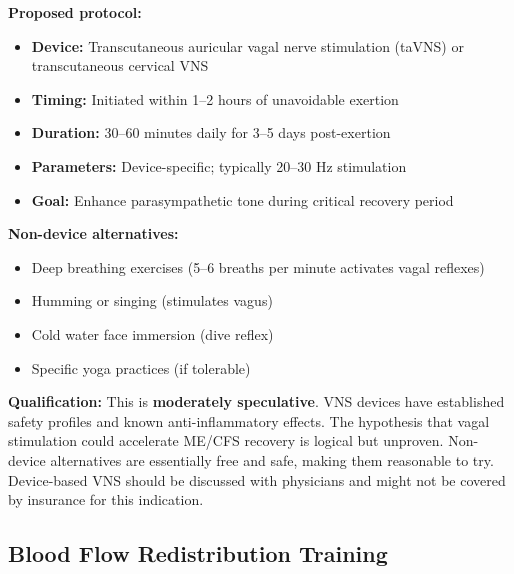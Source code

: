\begin{speculation}
\textbf{Proposed protocol:}
\begin{itemize}
    \item \textbf{Device:} Transcutaneous auricular vagal nerve stimulation (taVNS) or transcutaneous cervical VNS
    \item \textbf{Timing:} Initiated within 1--2 hours of unavoidable exertion
    \item \textbf{Duration:} 30--60 minutes daily for 3--5 days post-exertion
    \item \textbf{Parameters:} Device-specific; typically 20--30 Hz stimulation
    \item \textbf{Goal:} Enhance parasympathetic tone during critical recovery period
\end{itemize}

\textbf{Non-device alternatives:}
\begin{itemize}
    \item Deep breathing exercises (5--6 breaths per minute activates vagal reflexes)
    \item Humming or singing (stimulates vagus)
    \item Cold water face immersion (dive reflex)
    \item Specific yoga practices (if tolerable)
\end{itemize}

\textbf{Qualification:} This is \textbf{moderately speculative}. VNS devices have established safety profiles and known anti-inflammatory effects. The hypothesis that vagal stimulation could accelerate ME/CFS recovery is logical but unproven. Non-device alternatives are essentially free and safe, making them reasonable to try. Device-based VNS should be discussed with physicians and might not be covered by insurance for this indication.
\end{speculation}

\subsection{Blood Flow Redistribution Training}
\label{subsec:blood-flow-training}

